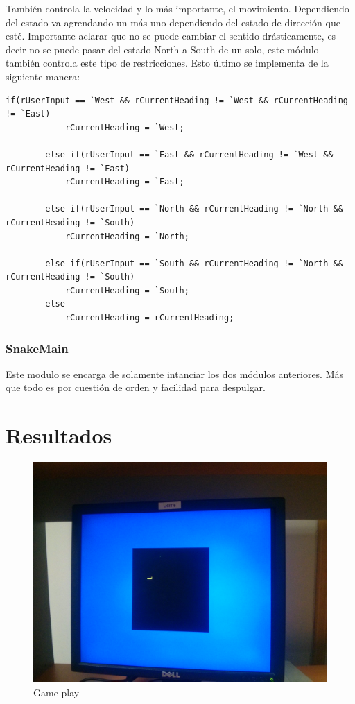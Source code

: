 \documentclass[10pt]{article}
\begin{document}
También controla la velocidad y lo más importante, el movimiento. Dependiendo del estado va agrendando un más uno dependiendo del estado de dirección que esté. Importante aclarar que no se puede cambiar el sentido drásticamente, es decir no se puede pasar del estado North a South de un solo, este módulo también controla este tipo de restricciones. Esto último se implementa de la siguiente manera:

\begin{lstlisting}
if(rUserInput == `West && rCurrentHeading != `West && rCurrentHeading != `East)
			rCurrentHeading = `West;

		else if(rUserInput == `East && rCurrentHeading != `West && rCurrentHeading != `East)
			rCurrentHeading = `East;

		else if(rUserInput == `North && rCurrentHeading != `North && rCurrentHeading != `South)
			rCurrentHeading = `North;

		else if(rUserInput == `South && rCurrentHeading != `North && rCurrentHeading != `South)
			rCurrentHeading = `South;
		else
			rCurrentHeading = rCurrentHeading;
\end{lstlisting}

\subsubsection{SnakeMain}
Este modulo se encarga de solamente intanciar los dos módulos anteriores. Más que todo es por cuestión de orden y facilidad para despulgar.

\section{Resultados}

\begin{figure}[hbtp]
\centering
\includegraphics[width=1\textwidth]{game-play}
\caption{Game play}
\label{vga-play}
\end{figure}
\end{document}
